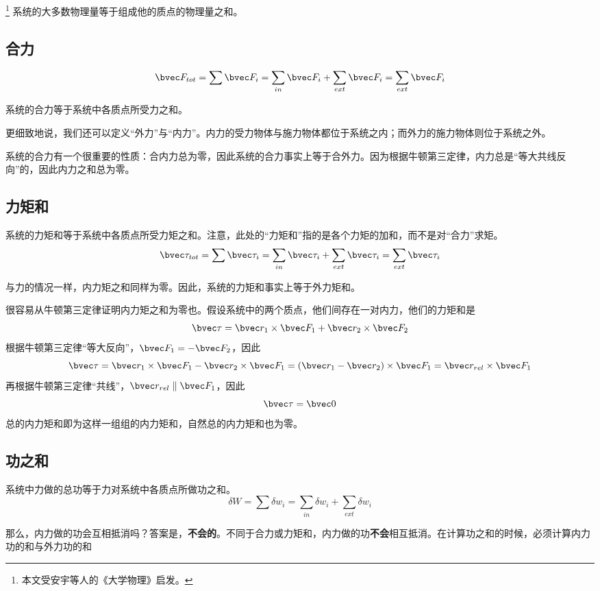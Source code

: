 

\footnote{本文受安宇等人的《大学物理》启发。}
系统的大多数物理量等于组成他的质点的物理量之和。
\subsection{合力}
\begin{equation}
\bvec F_{tot}=\sum \bvec F_i=\sum_{in} \bvec F_i + \sum_{ext} \bvec F_i = \sum_{ext} \bvec F_i
\end{equation}

系统的合力等于系统中各质点所受力之和。

更细致地说，我们还可以定义“外力”与“内力”。内力的受力物体与施力物体都位于系统之内；而外力的施力物体则位于系统之外。

系统的合力有一个很重要的性质：合内力总为零，因此系统的合力事实上等于合外力。因为根据牛顿第三定律，内力总是“等大共线反向”的，因此内力之和总为零。

\subsection{力矩和}
系统的力矩和等于系统中各质点所受力矩之和。注意，此处的“力矩和”指的是各个力矩的加和，而不是对“合力”求矩。
\begin{equation}
\bvec \tau_{tot}=\sum \bvec \tau_i=\sum_{in} \bvec \tau_i + \sum_{ext} \bvec \tau_i = \sum_{ext} \bvec \tau_i
\end{equation}

与力的情况一样，内力矩之和同样为零。因此，系统的力矩和事实上等于外力矩和。

很容易从牛顿第三定律证明内力矩之和为零也。假设系统中的两个质点，他们间存在一对内力，他们的力矩和是
$$\bvec \tau = \bvec r_1 \times \bvec F_1 + \bvec r_2 \times \bvec F_2$$
根据牛顿第三定律“等大反向”，$\bvec F_1=-\bvec F_2$，因此
$$\bvec \tau = \bvec r_1 \times \bvec F_1 - \bvec r_2 \times \bvec F_1 = (\bvec r_1 - \bvec r_2) \times \bvec F_1 = \bvec r_{rel}\times \bvec F_1$$
再根据牛顿第三定律“共线”，$\bvec r_{rel} \parallel \bvec F_1 $，因此
$$\bvec \tau = \bvec 0$$
总的内力矩和即为这样一组组的内力矩和，自然总的内力矩和也为零。

\subsection{功之和}
系统中力做的总功等于力对系统中各质点所做功之和。
\begin{equation}
\delta W = \sum \delta w_i = \sum_{in} \delta w_i + \sum_{ext} \delta w_i
\end{equation}

那么，内力做的功会互相抵消吗？答案是，\textbf{不会的}。不同于合力或力矩和，内力做的功\textbf{不会}相互抵消。在计算功之和的时候，必须计算内力功的和与外力功的和
